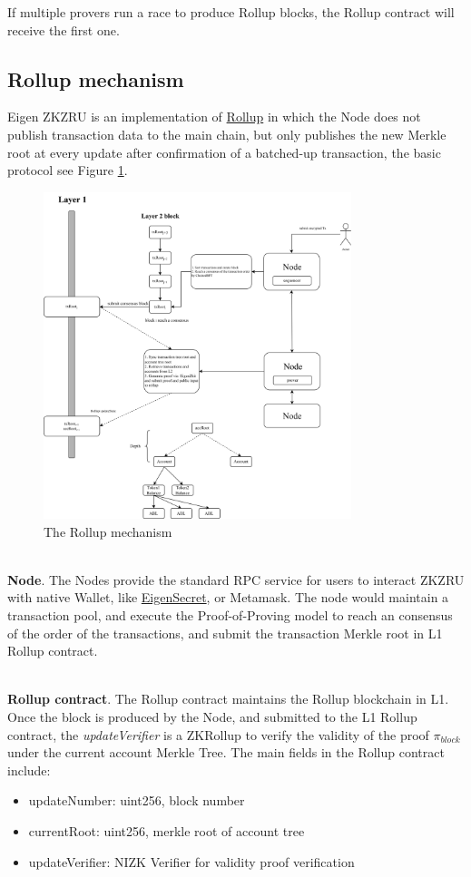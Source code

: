 \documentclass{article}
\begin{document}
If multiple provers run a race to produce Rollup blocks, the Rollup contract will receive the first one.   


\subsection{Rollup mechanism}

Eigen ZKZRU is an implementation of \href{https://vitalik.ca/general/2021/01/05/rollup.html}{Rollup} in which the Node does not publish transaction data to the main chain, but only publishes the new Merkle root at every update after confirmation of a batched-up transaction, the basic protocol see Figure \ref{fig:rollup}.

\begin{figure}
    \centering
    \includegraphics[width=0.8\textwidth]{rollup.drawio.png}
    \caption{\label{fig:rollup}The Rollup mechanism}
\end{figure}

~\\
\noindent\textbf{Node}. The Nodes provide the standard RPC service for users to interact ZKZRU with native Wallet, like \href{https://secret.eigen.cash}{EigenSecret}, or Metamask. The node would maintain a transaction pool, and execute the Proof-of-Proving model to reach an consensus of the order of the transactions, and submit the transaction Merkle root in L1 Rollup contract.


~\\
\noindent\textbf{Rollup contract}. The Rollup contract maintains the Rollup blockchain in L1. Once the block is produced by the Node, and submitted to the L1 Rollup contract, the \textit{updateVerifier} is a ZKRollup to verify the validity of the proof $\pi_{block}$ under the current account Merkle Tree. The main fields in the Rollup contract include:
\begin{itemize}
    \item updateNumber: uint256, block number
    \item currentRoot: uint256, merkle root of account tree
    \item updateVerifier: NIZK Verifier for validity proof verification
\end{itemize}
\end{document}
